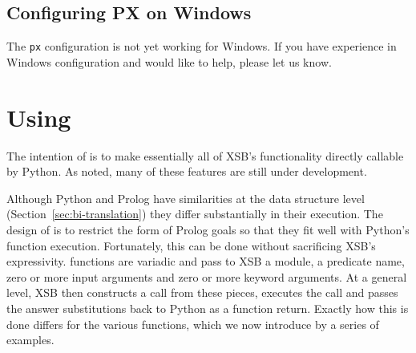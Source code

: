 %
%

\subsection{Configuring PX on Windows}

The {\tt px} configuration is not yet working for Windows.  If you
have experience in Windows configuration and would like to help,
please let us know.

\section{Using \px}

The intention of \px{} is to make essentially all of XSB's
functionality directly callable by Python.  As noted, many of these
features are still under development.

Although Python and Prolog have similarities at the data structure
level (Section~\ref{sec:bi-translation}) they differ substantially in
their execution.  The design of \px{} is to restrict the form of
Prolog goals so that they fit well with Python's function execution.
Fortunately, this can be done without sacrificing XSB's expressivity.
\px{} functions are variadic and pass to XSB a module, a predicate
name, zero or more input arguments and zero or more keyword arguments.
At a general level, XSB then constructs a call from these pieces,
executes the call and passes the answer substitutions back to Python
as a function return. Exactly how this is done differs for the various
\px{} functions, which we now introduce by a series of examples.  

